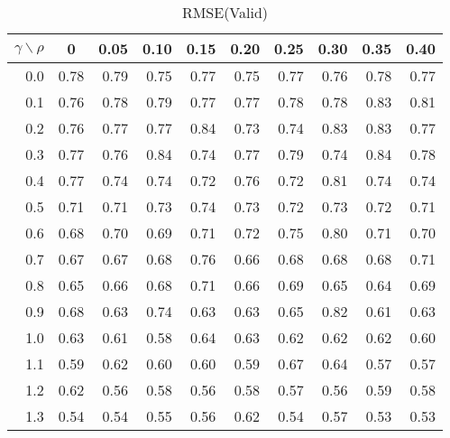 \documentclass[12pt]{article}
\begin{document}
%
\begin{table}[!tbp]
\caption{RMSE(Valid)}
 \begin{center}
 \begin{tabular}{r|rrrrrrrrr}\hline\hline
\multicolumn{1}{c|}{$\gamma\backslash\rho$}&\multicolumn{1}{c}{0}&\multicolumn{1}{c}{0.05}&\multicolumn{1}{c}{0.10}&\multicolumn{1}{c}{0.15}&\multicolumn{1}{c}{0.20}&\multicolumn{1}{c}{0.25}&\multicolumn{1}{c}{0.30}&\multicolumn{1}{c}{0.35}&\multicolumn{1}{c}{0.40}\tabularnewline
\hline

0.0&0.78&0.79&0.75&0.77&0.75&0.77&0.76&0.78&0.77\tabularnewline
0.1&0.76&0.78&0.79&0.77&0.77&0.78&0.78&0.83&0.81\tabularnewline
0.2&0.76&0.77&0.77&0.84&0.73&0.74&0.83&0.83&0.77\tabularnewline
0.3&0.77&0.76&0.84&0.74&0.77&0.79&0.74&0.84&0.78\tabularnewline
0.4&0.77&0.74&0.74&0.72&0.76&0.72&0.81&0.74&0.74\tabularnewline
0.5&0.71&0.71&0.73&0.74&0.73&0.72&0.73&0.72&0.71\tabularnewline
0.6&0.68&0.70&0.69&0.71&0.72&0.75&0.80&0.71&0.70\tabularnewline
0.7&0.67&0.67&0.68&0.76&0.66&0.68&0.68&0.68&0.71\tabularnewline
0.8&0.65&0.66&0.68&0.71&0.66&0.69&0.65&0.64&0.69\tabularnewline
0.9&0.68&0.63&0.74&0.63&0.63&0.65&0.82&0.61&0.63\tabularnewline
1.0&0.63&0.61&0.58&0.64&0.63&0.62&0.62&0.62&0.60\tabularnewline
1.1&0.59&0.62&0.60&0.60&0.59&0.67&0.64&0.57&0.57\tabularnewline
1.2&0.62&0.56&0.58&0.56&0.58&0.57&0.56&0.59&0.58\tabularnewline
1.3&0.54&0.54&0.55&0.56&0.62&0.54&0.57&0.53&0.53\tabularnewline
\hline
\end{tabular}

\end{center}

\end{table}
\end{document}
